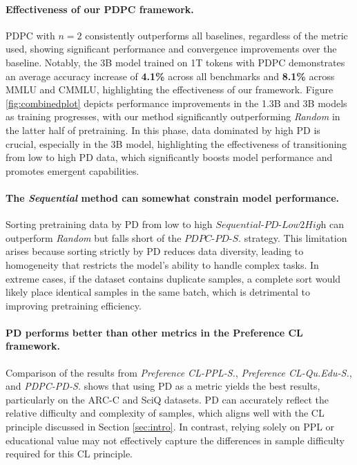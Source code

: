 \documentclass[11pt]{article}
\begin{document}
\paragraph{Effectiveness of our PDPC framework.} PDPC with \( n=2 \) consistently outperforms all baselines, regardless of the metric used, showing significant performance and convergence improvements over the baseline. Notably, the 3B model trained on 1T tokens with PDPC demonstrates an average accuracy increase of \textbf{4.1\%} across all benchmarks and \textbf{8.1\%} across MMLU and CMMLU, highlighting the effectiveness of our framework. Figure \ref{fig:combinedplot} depicts performance improvements in the 1.3B and 3B models as training progresses, with our method significantly outperforming \textit{Random} in the latter half of pretraining. In this phase, data dominated by high PD is crucial, especially in the 3B model, highlighting the effectiveness of transitioning from low to high PD data, which significantly boosts model performance and promotes emergent capabilities.

\paragraph{The \textit{Sequential} method can somewhat constrain model performance.} Sorting pretraining data by PD from low to high ${\textit{Sequential-PD-Low2High}}$ can outperform \textit{Random} but falls short of the \({\textit{PDPC-PD-S.}}\) strategy. This limitation arises because sorting strictly by PD reduces data diversity, leading to homogeneity that restricts the model's ability to handle complex tasks. In extreme cases, if the dataset contains duplicate samples, a complete sort would likely place identical samples in the same batch, which is detrimental to improving pretraining efficiency.

\paragraph{PD performs better than other metrics in the Preference CL framework. }
Comparison of the results from \textit{Preference CL-PPL-S.}, \textit{Preference CL-Qu.Edu-S.}, and \textit{PDPC-PD-S.} shows that using PD as a metric yields the best results, particularly on the ARC-C and SciQ datasets. PD can accurately reflect the relative difficulty and complexity of samples, which aligns well with the CL principle discussed in Section \ref{sec:intro}. In contrast, relying solely on PPL or educational value may not effectively capture the differences in sample difficulty required for this CL principle.
\end{document}
